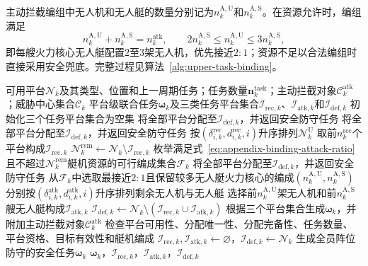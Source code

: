 主动拦截编组中无人机和无人艇的数量分别记为$n_k^{\mathrm{A,U}}$和$n_k^{\mathrm{A,S}}$。在资源允许时，编组满足
\begin{equation}
    n_k^{\mathrm{A,U}}+n_k^{\mathrm{A,S}}=n_k^{\mathrm{atk}},
    \qquad
    2n_k^{\mathrm{A,S}}\leq n_k^{\mathrm{A,U}}
    \leq3n_k^{\mathrm{A,S}},
    \label{eq:appendix-binding-attack-ratio}
\end{equation}
即每艘火力核心无人艇配置$2$至$3$架无人机，优先接近$2{:}1$；资源不足以合法编组时直接采用安全兜底。完整过程见算法~\ref{alg:upper-task-binding}。

\begin{algorithm}[!htbp]
\caption{上层任务绑定与安全校验}
\label{alg:upper-task-binding}
\small
\begin{algorithmic}[1]
\Require 可用平台$\mathcal N_k$及其类型、位置和上一周期任务；任务数量$\boldsymbol n_k^{\mathrm{task}}$；主动拦截对象$\mathcal C_k^{\mathrm{atk}}$；威胁中心集合$\mathcal C_k$
\Ensure 平台级联合任务$\boldsymbol\omega_k$及三类任务平台集合$\mathcal I_{\mathrm{rec},k}$、$\mathcal I_{\mathrm{atk},k}$和$\mathcal I_{\mathrm{def},k}$
\State 初始化三个任务平台集合为空集
    \State 将全部平台分配至$\mathcal I_{\mathrm{def},k}$，并返回安全防守任务
\EndIf
{}
    \State 将全部平台分配至$\mathcal I_{\mathrm{def},k}$，并返回安全防守任务
\EndIf
\State 按$(\delta_{i,k}^{\mathrm{rec}},d_{i,k}^{\mathrm{rec}},i)$升序排列$\mathcal N_k^{\mathrm U}$
\State 取前$n_k^{\mathrm{rec}}$个平台构成$\mathcal I_{\mathrm{rec},k}$
\State $\mathcal N_k^{\mathrm{rem}}\gets\mathcal N_k\setminus\mathcal I_{\mathrm{rec},k}$
\State 枚举满足式~\eqref{eq:appendix-binding-attack-ratio}且不超过$\mathcal N_k^{\mathrm{rem}}$艇机资源的可行编成集合$\mathcal F_k$
    \State 将全部平台分配至$\mathcal I_{\mathrm{def},k}$，并返回安全防守任务
\EndIf
{}
    \State 从$\mathcal F_k$中选取最接近$2{:}1$且保留较多无人艇火力核心的编成$(n_k^{\mathrm{A,U}},n_k^{\mathrm{A,S}})$
    \State 分别按$(\delta_{i,k}^{\mathrm{atk}},d_{i,k}^{\mathrm{atk}},i)$升序排列剩余无人机与无人艇
    \State 选择前$n_k^{\mathrm{A,U}}$架无人机和前$n_k^{\mathrm{A,S}}$艘无人艇构成$\mathcal I_{\mathrm{atk},k}$
\EndIf
\State $\mathcal I_{\mathrm{def},k}\gets\mathcal N_k\setminus(\mathcal I_{\mathrm{rec},k}\cup\mathcal I_{\mathrm{atk},k})$
\State 根据三个平台集合生成$\boldsymbol\omega_k$，并附加主动拦截对象$\mathcal C_k^{\mathrm{atk}}$
\State 检查平台可用性、分配唯一性、分配完备性、任务数量、平台资格、目标有效性和艇机编成
    \State $\mathcal I_{\mathrm{rec},k},\mathcal I_{\mathrm{atk},k}\gets\varnothing$，$\mathcal I_{\mathrm{def},k}\gets\mathcal N_k$
    \State 生成全员阵位防守的安全任务$\boldsymbol\omega_k$
\EndIf
\State \Return $\boldsymbol\omega_k$，$\mathcal I_{\mathrm{rec},k}$，$\mathcal I_{\mathrm{atk},k}$，$\mathcal I_{\mathrm{def},k}$
\end{algorithmic}
\end{algorithm}

